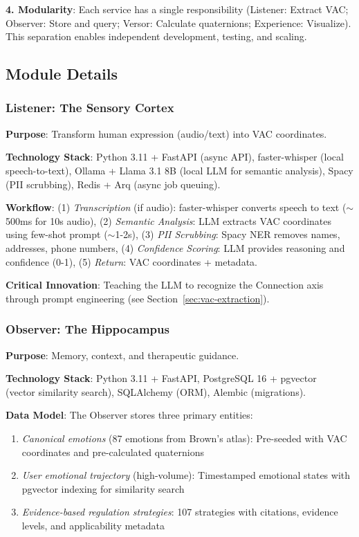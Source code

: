 \documentclass[10pt,twocolumn]{article}
\begin{document}
\textbf{4. Modularity}: Each service has a single responsibility (Listener: Extract VAC; Observer: Store and query; Versor: Calculate quaternions; Experience: Visualize). This separation enables independent development, testing, and scaling.

\subsection{Module Details}

\subsubsection{Listener: The Sensory Cortex}

\textbf{Purpose}: Transform human expression (audio/text) into VAC coordinates.

\textbf{Technology Stack}: Python 3.11 + FastAPI (async API), faster-whisper (local speech-to-text), Ollama + Llama 3.1 8B (local LLM for semantic analysis), Spacy (PII scrubbing), Redis + Arq (async job queuing).

\textbf{Workflow}: (1) \textit{Transcription} (if audio): faster-whisper converts speech to text ($\sim$500ms for 10s audio), (2) \textit{Semantic Analysis}: LLM extracts VAC coordinates using few-shot prompt ($\sim$1-2s), (3) \textit{PII Scrubbing}: Spacy NER removes names, addresses, phone numbers, (4) \textit{Confidence Scoring}: LLM provides reasoning and confidence (0-1), (5) \textit{Return}: VAC coordinates + metadata.

\textbf{Critical Innovation}: Teaching the LLM to recognize the Connection axis through prompt engineering (see Section~\ref{sec:vac-extraction}).

\subsubsection{Observer: The Hippocampus}

\textbf{Purpose}: Memory, context, and therapeutic guidance.

\textbf{Technology Stack}: Python 3.11 + FastAPI, PostgreSQL 16 + pgvector~\cite{pgvector2023} (vector similarity search), SQLAlchemy (ORM), Alembic (migrations).

\textbf{Data Model}: The Observer stores three primary entities:

\begin{enumerate}
    \item \textit{Canonical emotions} (87 emotions from Brown's atlas): Pre-seeded with VAC coordinates and pre-calculated quaternions
    \item \textit{User emotional trajectory} (high-volume): Timestamped emotional states with pgvector indexing for similarity search
    \item \textit{Evidence-based regulation strategies}: 107 strategies with citations, evidence levels, and applicability metadata
\end{enumerate}
\end{document}
